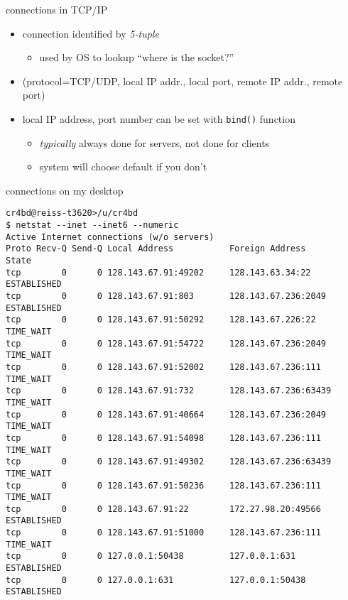 \begin{frame}{connections in TCP/IP}
    \begin{itemize}
    \item connection identified by \textit{5-tuple}
        \begin{itemize}
        \item used by OS to lookup ``where is the socket?''
        \end{itemize}
    \item \small(protocol=TCP/UDP, local IP addr., local port, remote IP addr., remote port)
    \vspace{.5cm}
    \item local IP address, port number can be set with \texttt{bind()} function
        \begin{itemize}
        \item \textit{typically} always done for servers, not done for clients
        \item system will choose default if you don't
        \end{itemize}
    \end{itemize}
\end{frame}

\begin{frame}[fragile,label=laptopNetstat]{connections on my desktop}
\begin{lstlisting}[language={},basicstyle=\fontsize{9.5}{10.5}\selectfont]
cr4bd@reiss-t3620>/u/cr4bd
$ netstat --inet --inet6 --numeric
Active Internet connections (w/o servers)
Proto Recv-Q Send-Q Local Address           Foreign Address         State      
tcp        0      0 128.143.67.91:49202     128.143.63.34:22        ESTABLISHED
tcp        0      0 128.143.67.91:803       128.143.67.236:2049     ESTABLISHED
tcp        0      0 128.143.67.91:50292     128.143.67.226:22       TIME_WAIT  
tcp        0      0 128.143.67.91:54722     128.143.67.236:2049     TIME_WAIT  
tcp        0      0 128.143.67.91:52002     128.143.67.236:111      TIME_WAIT  
tcp        0      0 128.143.67.91:732       128.143.67.236:63439    TIME_WAIT  
tcp        0      0 128.143.67.91:40664     128.143.67.236:2049     TIME_WAIT  
tcp        0      0 128.143.67.91:54098     128.143.67.236:111      TIME_WAIT  
tcp        0      0 128.143.67.91:49302     128.143.67.236:63439    TIME_WAIT  
tcp        0      0 128.143.67.91:50236     128.143.67.236:111      TIME_WAIT  
tcp        0      0 128.143.67.91:22        172.27.98.20:49566      ESTABLISHED
tcp        0      0 128.143.67.91:51000     128.143.67.236:111      TIME_WAIT  
tcp        0      0 127.0.0.1:50438         127.0.0.1:631           ESTABLISHED
tcp        0      0 127.0.0.1:631           127.0.0.1:50438         ESTABLISHED
\end{lstlisting}
\end{frame}

